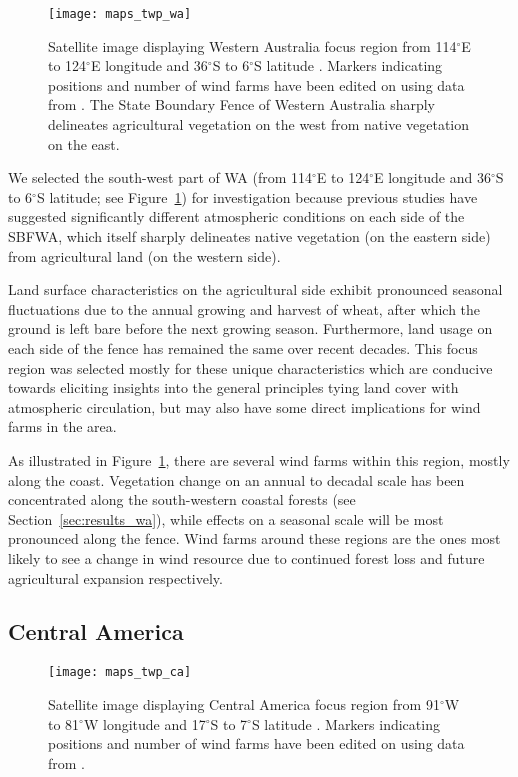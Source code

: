 \begin{figure}[!ht]
	\centering
	\texttt{[image: maps\_twp\_wa]}
	\caption[Western Australia Map]{Satellite image displaying Western Australia focus region from 114$^\circ$E to 124$^\circ$E longitude and 36$^\circ$S to 6$^\circ$S latitude \citep{maps_wa}. Markers indicating positions and number of wind farms have been edited on using data from \citep{twp_wa}. The State Boundary Fence of Western Australia sharply delineates agricultural vegetation on the west from native vegetation on the east.}
	\label{fig:maps_twp_wa}
\end{figure}

We selected the south-west part of \ac{WA} (from 114$^\circ$E to 124$^\circ$E longitude and 36$^\circ$S to 6$^\circ$S latitude; see Figure~\ref{fig:maps_twp_wa}) for investigation because previous studies \citep{lyons1993, lyons1996, lyons2002, xinmei1995, ray2003, esau2002} have suggested significantly different atmospheric conditions on each side of the \ac{SBFWA}, which itself sharply delineates native vegetation (on the eastern side) from agricultural land (on the western side).

Land surface characteristics on the agricultural side exhibit pronounced seasonal fluctuations due to the annual growing and harvest of wheat, after which the ground is left bare before the next growing season. Furthermore, land usage on each side of the fence has remained the same over recent decades. This focus region was selected mostly for these unique characteristics which are conducive towards eliciting insights into the general principles tying land cover with atmospheric circulation, but may also have some direct implications for wind farms in the area.

As illustrated in Figure~\ref{fig:maps_twp_wa}, there are several wind farms within this region, mostly along the coast. Vegetation change on an annual to decadal scale has been concentrated along the south-western coastal forests (see Section~\ref{sec:results_wa}), while effects on a seasonal scale will be most pronounced along the fence. Wind farms around these regions are the ones most likely to see a change in wind resource due to continued forest loss and future agricultural expansion respectively.

\subsection{Central America}

\begin{figure}[!ht]
	\centering
	\texttt{[image: maps\_twp\_ca]}
	\caption[Central America Map]{Satellite image displaying Central America focus region from 91$^\circ$W to 81$^\circ$W longitude and 17$^\circ$S to 7$^\circ$S latitude \citep{maps_ca}. Markers indicating positions and number of wind farms have been edited on using data from \citep{twp_hd, twp_nc, twp_cr}.}
	\label{fig:maps_twp_ca}
\end{figure}

